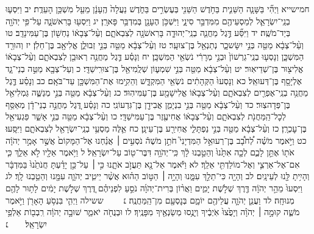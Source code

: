 \documentclass[twoside, openany, parskip=half, 11pt]{book}
\begin{document}
חמישייא וַיְהִ֞י בַּשָּׁנָ֧ה הַשֵּׁנִ֛ית בַּחֹ֥דֶשׁ הַשֵּׁנִ֖י בְּעֶשְׂרִ֣ים בַּחֹ֑דֶשׁ נַעֲלָה֙ הֶֽעָנָ֔ן מֵעַ֖ל מִשְׁכַּ֥ן הָעֵדֻֽת׃ יב וַיִּסְע֧וּ בְנֵֽי־יִשְׂרָאֵ֛ל לְמַסְעֵיהֶ֖ם מִמִּדְבַּ֣ר סִינָ֑י וַיִּשְׁכֹּ֥ן הֶעָנָ֖ן בְּמִדְבַּ֥ר פָּארָֽן׃ יג וַיִּסְע֖וּ בָּרִאשֹׁנָ֑ה עַל־פִּ֥י יְהֹוָ֖ה בְּיַד־מֹשֶֽׁה׃ יד וַיִּסַּ֞ע דֶּ֣גֶל מַחֲנֵ֧ה בְנֵֽי־יְהוּדָ֛ה בָּרִאשֹׁנָ֖ה לְצִבְאֹתָ֑ם וְעַ֨ל־צְבָא֔וֹ נַחְשׁ֖וֹן בֶּן־עַמִּינָדָֽב׃ טו וְעַ֨ל־צְבָ֔א מַטֵּ֖ה בְּנֵ֣י יִשָּׂשכָ֑ר נְתַנְאֵ֖ל בֶּן־צוּעָֽר׃ טז וְעַ֨ל־צְבָ֔א מַטֵּ֖ה בְּנֵ֣י זְבוּלֻ֑ן אֱלִיאָ֖ב בֶּן־חֵלֹֽן׃ יז וְהוּרַ֖ד הַמִּשְׁכָּ֑ן וְנָסְע֤וּ בְנֵֽי־גֵרְשׁוֹן֙ וּבְנֵ֣י מְרָרִ֔י נֹשְׂאֵ֖י הַמִּשְׁכָּֽן׃ יח וְנָסַ֗ע דֶּ֛גֶל מַחֲנֵ֥ה רְאוּבֵ֖ן לְצִבְאֹתָ֑ם וְעַ֨ל־צְבָא֔וֹ אֱלִיצ֖וּר בֶּן־שְׁדֵיאֽוּר׃ יט וְעַ֨ל־צְבָ֔א מַטֵּ֖ה בְּנֵ֣י שִׁמְע֑וֹן שְׁלֻֽמִיאֵ֖ל בֶּן־צוּרִֽישַׁדָּֽי׃ כ וְעַל־צְבָ֖א מַטֵּ֣ה בְנֵי־גָ֑ד אֶלְיָסָ֖ף בֶּן־דְּעוּאֵֽל׃ כא וְנָסְעוּ֙ הַקְּהָתִ֔ים נֹשְׂאֵ֖י הַמִּקְדָּ֑שׁ וְהֵקִ֥ימוּ אֶת־הַמִּשְׁכָּ֖ן עַד־בֹּאָֽם׃ כב וְנָסַ֗ע דֶּ֛גֶל מַחֲנֵ֥ה בְנֵֽי־אֶפְרַ֖יִם לְצִבְאֹתָ֑ם וְעַ֨ל־צְבָא֔וֹ אֱלִישָׁמָ֖ע בֶּן־עַמִּיהֽוּד׃ כג וְעַ֨ל־צְבָ֔א מַטֵּ֖ה בְּנֵ֣י מְנַשֶּׁ֑ה גַּמְלִיאֵ֖ל בֶּן־פְּדָהצֽוּר׃ כד וְעַ֨ל־צְבָ֔א מַטֵּ֖ה בְּנֵ֣י בִנְיָמִ֑ן אֲבִידָ֖ן בֶּן־גִּדְעוֹנִֽי׃ כה וְנָסַ֗ע דֶּ֚גֶל מַחֲנֵ֣ה בְנֵי־דָ֔ן מְאַסֵּ֥ף לְכׇל־הַֽמַּחֲנֹ֖ת לְצִבְאֹתָ֑ם וְעַ֨ל־צְבָא֔וֹ אֲחִיעֶ֖זֶר בֶּן־עַמִּישַׁדָּֽי׃ כו וְעַ֨ל־צְבָ֔א מַטֵּ֖ה בְּנֵ֣י אָשֵׁ֑ר פַּגְעִיאֵ֖ל בֶּן־עׇכְרָֽן׃ כז וְעַ֨ל־צְבָ֔א מַטֵּ֖ה בְּנֵ֣י נַפְתָּלִ֑י אֲחִירַ֖ע בֶּן־עֵינָֽן׃ כח אֵ֛לֶּה מַסְעֵ֥י בְנֵֽי־יִשְׂרָאֵ֖ל לְצִבְאֹתָ֑ם וַיִּסָּֽעוּ׃
כט וַיֹּ֣אמֶר מֹשֶׁ֗ה לְ֠חֹבָ֠ב בֶּן־רְעוּאֵ֣ל הַמִּדְיָנִי֮ חֹתֵ֣ן מֹשֶׁה֒ נֹסְעִ֣ים ׀ אֲנַ֗חְנוּ אֶל־הַמָּקוֹם֙ אֲשֶׁ֣ר אָמַ֣ר יְהֹוָ֔ה אֹת֖וֹ אֶתֵּ֣ן לָכֶ֑ם לְכָ֤ה אִתָּ֙נוּ֙ וְהֵטַ֣בְנוּ לָ֔ךְ כִּֽי־יְהֹוָ֥ה דִּבֶּר־ט֖וֹב עַל־יִשְׂרָאֵֽל׃ ל וַיֹּ֥אמֶר אֵלָ֖יו לֹ֣א אֵלֵ֑ךְ כִּ֧י אִם־אֶל־אַרְצִ֛י וְאֶל־מוֹלַדְתִּ֖י אֵלֵֽךְ׃ לא וַיֹּ֕אמֶר אַל־נָ֖א תַּעֲזֹ֣ב אֹתָ֑נוּ כִּ֣י ׀ עַל־כֵּ֣ן יָדַ֗עְתָּ חֲנֹתֵ֙נוּ֙ בַּמִּדְבָּ֔ר וְהָיִ֥יתָ לָּ֖נוּ לְעֵינָֽיִם׃ לב וְהָיָ֖ה כִּי־תֵלֵ֣ךְ עִמָּ֑נוּ וְהָיָ֣ה ׀ הַטּ֣וֹב הַה֗וּא אֲשֶׁ֨ר יֵיטִ֧יב יְהֹוָ֛ה עִמָּ֖נוּ וְהֵטַ֥בְנוּ לָֽךְ׃ לג וַיִּסְעוּ֙ מֵהַ֣ר יְהֹוָ֔ה דֶּ֖רֶךְ שְׁלֹ֣שֶׁת יָמִ֑ים וַאֲר֨וֹן בְּרִית־יְהֹוָ֜ה נֹסֵ֣עַ לִפְנֵיהֶ֗ם דֶּ֚רֶךְ שְׁלֹ֣שֶׁת יָמִ֔ים לָת֥וּר לָהֶ֖ם מְנוּחָֽה׃ לד וַעֲנַ֧ן יְהֹוָ֛ה עֲלֵיהֶ֖ם יוֹמָ֑ם בְּנׇסְעָ֖ם מִן־הַֽמַּחֲנֶֽה׃
׆   ששילה וַיְהִ֛י בִּנְסֹ֥עַ הָאָרֹ֖ן וַיֹּ֣אמֶר מֹשֶׁ֑ה קוּמָ֣ה ׀ יְהֹוָ֗ה וְיָפֻ֙צוּ֙ אֹֽיְבֶ֔יךָ וְיָנֻ֥סוּ מְשַׂנְאֶ֖יךָ מִפָּנֶֽיךָ׃ לו וּבְנֻחֹ֖ה יֹאמַ֑ר שׁוּבָ֣ה יְהֹוָ֔ה רִֽבְב֖וֹת אַלְפֵ֥י יִשְׂרָאֵֽל׃  ׆
\end{document}
